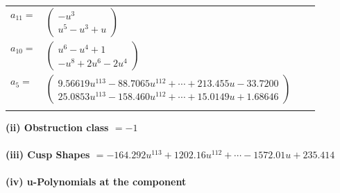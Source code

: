 \documentclass[1p]{elsarticle_modified}
\theoremstyle{definition}
\begin{document}
\begin{tabular}{m{7pt} m{180pt} m{7pt} m{180pt} }
\flushright $a_{11}=$&$\begin{pmatrix}- u^3\\u^5- u^3+u\end{pmatrix}$ \\
\flushright $a_{10}=$&$\begin{pmatrix}u^6- u^4+1\\- u^8+2 u^6-2 u^4\end{pmatrix}$ \\
\flushright $a_{5}=$&$\begin{pmatrix}9.56619 u^{113}-88.7065 u^{112}+\cdots+213.455 u-33.7200\\25.0853 u^{113}-158.460 u^{112}+\cdots+15.0149 u+1.68646\end{pmatrix}$\\&\end{tabular}
\flushleft \textbf{(ii) Obstruction class $= -1$}\\~\\
\flushleft \textbf{(iii) Cusp Shapes $= -164.292 u^{113}+1202.16 u^{112}+\cdots-1572.01 u+235.414$}\\~\\
\newpage\renewcommand{\arraystretch}{1}
\flushleft \textbf{(iv) u-Polynomials at the component}\newline \\
\end{document}
